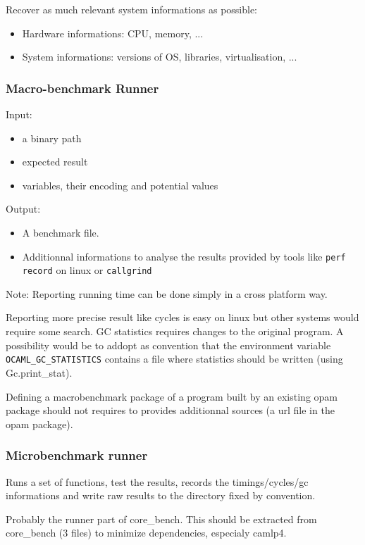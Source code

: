 \documentclass[11pt,a4paper]{article}
\begin{document}
Recover as much relevant system informations as possible:
\begin{itemize}
\item Hardware informations: CPU, memory, ...
\item System informations: versions of OS, libraries, virtualisation, ...
\end{itemize}

\subsubsection{Macro-benchmark Runner}

Input:
\begin{itemize}
\item a binary path
\item expected result
\item variables, their encoding and potential values
\end{itemize}

Output:
\begin{itemize}
\item A benchmark file.
\item Additionnal informations to analyse the results provided by
  tools like \texttt{perf record} on linux or \texttt{callgrind}
\end{itemize}

Note: Reporting running time can be done simply in a cross platform
way.

Reporting more precise result like cycles is easy on linux but
other systems would require some search. GC statistics requires
changes to the original program. A possibility would be to addopt as
convention that the environment variable
\texttt{OCAML\_GC\_STATISTICS} contains a file where statistics should
be written (using Gc.print\_stat).

Defining a macrobenchmark package of a program built by an existing
opam package should not requires to provides additionnal sources (a
url file in the opam package).

\subsubsection{Microbenchmark runner}

Runs a set of functions, test the results, records the
timings/cycles/gc informations and write raw results to the directory
fixed by convention.

Probably the runner part of core\_bench. This should be extracted from
core\_bench (3 files) to minimize dependencies, especialy camlp4.
\end{document}
